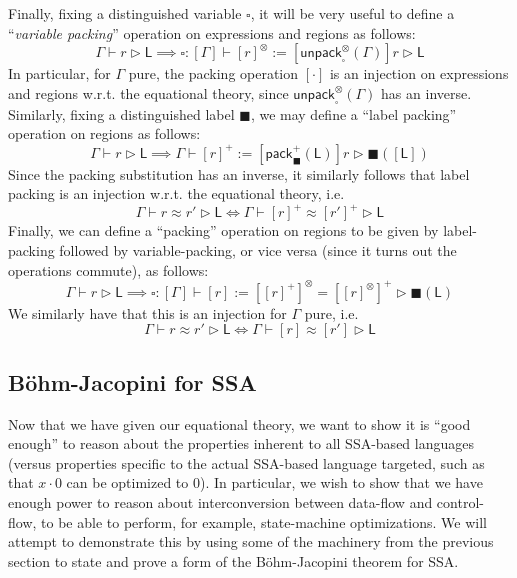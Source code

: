\documentclass[acmsmall,screen,review]{acmart}
\newcommand{\ms}[1]{\ensuremath{\mathsf{#1}}}
\newcommand{\haslb}[3]{#1 \vdash #2 \rhd #3}
\newcommand{\teqv}{\approx}
\newcommand{\lbeq}[4]{#1 \vdash #2 \teqv #3 \rhd {#4}}
\newcommand{\invar}{\square}
\newcommand{\outlb}{\blacksquare}
\begin{document}
Finally, fixing a distinguished variable $\invar$, it will be very useful to define 
a ``\emph{variable packing}'' operation on expressions and regions as follows:
\begin{equation}
  \haslb{\Gamma}{r}{\ms{L}} \implies 
  \haslb{\invar : [\Gamma]}{[r]^\otimes := [\ms{unpack}_{\invar}^\otimes(\Gamma)]r}{\ms{L}}
\end{equation}
In particular, for $\Gamma$ pure, the packing operation $[\cdot]$ is an injection on expressions and
regions w.r.t. the equational theory, since $\ms{unpack}_{\invar}^\otimes(\Gamma)$ has an inverse.
Similarly, fixing a distinguished label $\outlb$, we may define a ``label packing'' operation on
regions as follows:
\begin{equation}
  \haslb{\Gamma}{r}{\ms{L}} \implies 
  \haslb{\Gamma}{[r]^+ := [\ms{pack}_{\outlb}^+(\ms{L})]r}{\outlb([\ms{L}])}
\end{equation}
Since the packing substitution has an inverse, it similarly follows that label packing is an
injection w.r.t. the equational theory, i.e.
\begin{equation}
  \lbeq{\Gamma}{r}{r'}{\ms{L}} \iff \lbeq{\Gamma}{[r]^+}{[r']^+}{\ms{L}}
\end{equation}
Finally, we can define a ``packing'' operation on regions to be given by label-packing followed by
variable-packing, or vice versa (since it turns out the operations commute), as follows:
\begin{equation}
  \haslb{\Gamma}{r}{\ms{L}} \implies 
  \haslb{\invar : [\Gamma]}{[r] := [[r]^+]^\otimes = [[r]^\otimes]^+}{\outlb(\ms{L})}
\end{equation}
We similarly have that this is an injection for $\Gamma$ pure, i.e.
\begin{equation}
  \lbeq{\Gamma}{r}{r'}{\ms{L}} \iff \lbeq{\Gamma}{[r]}{[r']}{\ms{L}}
\end{equation}

\subsection{B\"ohm-Jacopini for SSA}

\label{ssec:data-control}

Now that we have given our equational theory, we want to show it is ``good enough'' to reason about
the properties inherent to all SSA-based languages (versus properties specific to the actual
SSA-based language targeted, such as that $x \cdot 0$ can be optimized to $0$). In particular, we
wish to show that we have enough power to reason about interconversion between data-flow and
control-flow, to be able to perform, for example, state-machine optimizations. We will attempt to
demonstrate this by using some of the machinery from the previous section to state and prove a form
of the B\"ohm-Jacopini theorem \cite{bohm-jacopini} for SSA.
\end{document}
